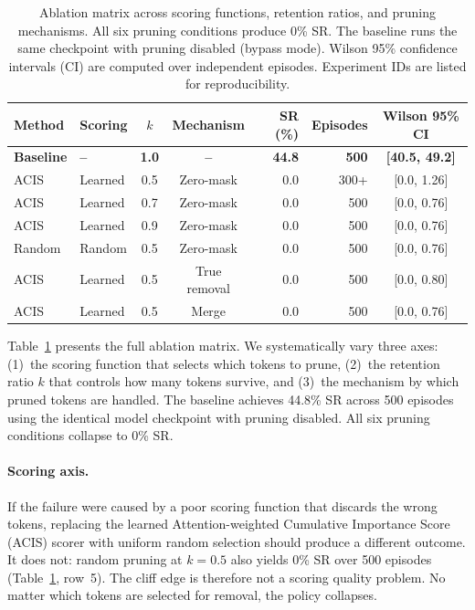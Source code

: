 \begin{table}[t]
\centering
\caption{Ablation matrix across scoring functions, retention ratios, and pruning mechanisms. All six pruning conditions produce 0\% SR. The baseline runs the same checkpoint with pruning disabled (bypass mode). Wilson 95\% confidence intervals (CI) are computed over independent episodes. Experiment IDs are listed for reproducibility.}
\label{tab:ablation_matrix}
\small
\begin{tabular}{@{}llccrrc@{}}
\toprule
Method & Scoring & $k$ & Mechanism & SR (\%) & Episodes & Wilson 95\% CI \\
\midrule
\textbf{Baseline} & \textbf{--} & \textbf{1.0} & \textbf{--} & \textbf{44.8} & \textbf{500} & \textbf{[40.5, 49.2]} \\
\midrule
ACIS & Learned & 0.5 & Zero-mask & 0.0 & 300+ & [0.0, 1.26] \\
ACIS & Learned & 0.7 & Zero-mask & 0.0 & 500 & [0.0, 0.76] \\
ACIS & Learned & 0.9 & Zero-mask & 0.0 & 500 & [0.0, 0.76] \\
Random & Random & 0.5 & Zero-mask & 0.0 & 500 & [0.0, 0.76] \\
ACIS & Learned & 0.5 & True removal & 0.0 & 500 & [0.0, 0.80] \\
ACIS & Learned & 0.5 & Merge & 0.0 & 500 & [0.0, 0.76] \\
\bottomrule
\end{tabular}
\end{table}

Table~\ref{tab:ablation_matrix} presents the full ablation matrix.
We systematically vary three axes: (1)~the scoring function that selects which tokens to prune, (2)~the retention ratio $k$ that controls how many tokens survive, and (3)~the mechanism by which pruned tokens are handled.
The baseline achieves 44.8\% SR across 500 episodes using the identical model checkpoint with pruning disabled.
All six pruning conditions collapse to 0\% SR.

\paragraph{Scoring axis.}
If the failure were caused by a poor scoring function that discards the wrong tokens, replacing the learned Attention-weighted Cumulative Importance Score (ACIS) scorer with uniform random selection should produce a different outcome.
It does not: random pruning at $k{=}0.5$ also yields 0\% SR over 500 episodes (Table~\ref{tab:ablation_matrix}, row~5).
The cliff edge is therefore not a scoring quality problem.
No matter which tokens are selected for removal, the policy collapses.

